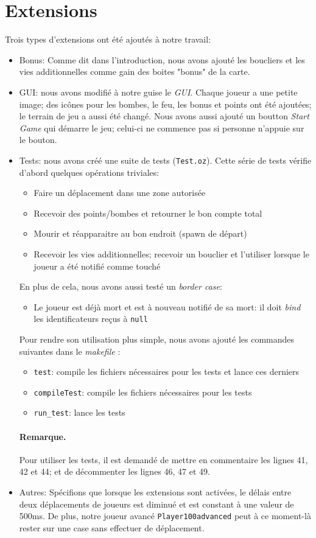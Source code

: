 \documentclass{article}
\begin{document}
\section{Extensions}
Trois types d'extensions ont été ajoutés à notre travail:
\begin{itemize}
	\item Bonus: Comme dit dans l'introduction, nous avons ajouté les boucliers et les vies additionnelles comme gain des boites "bonus" de la carte.
	\item GUI: nous avons modifié à notre guise le \emph{GUI}. Chaque joueur a une petite image; des icônes pour les bombes, le feu, les bonus et points ont été ajoutées; le terrain de jeu a aussi été changé. Nous avons aussi ajouté un boutton \emph{Start Game} qui démarre le jeu; celui-ci ne commence pas si personne n'appuie sur le bouton. 
	\item Tests: nous avons créé une suite de tests (\texttt{Test.oz}). Cette série de tests vérifie d'abord quelques opérations triviales:
		\begin{itemize}
			\item Faire un déplacement dans une zone autorisée
			\item Recevoir des points/bombes et retourner le bon compte total
			\item Mourir et réapparaitre au bon endroit (spawn de départ)
			\item Recevoir les vies additionnelles; recevoir un bouclier et l'utiliser lorsque le joueur a été notifié comme touché
		\end{itemize}
	En plus de cela, nous avons aussi testé un \emph{border case}:
		\begin{itemize}
			\item Le joueur est déjà mort et est à nouveau notifié de sa mort: il doit \emph{bind} les identificateurs reçus à \texttt{null}
			
		\end{itemize}
	Pour rendre son utilisation plus simple, nous avons ajouté les commandes suivantes dans le \emph{makefile} :
	\begin{itemize}
		\item \texttt{test}: compile les fichiers nécessaires pour les tests et lance ces derniers
		\item \texttt{compileTest}: compile les fichiers nécessaires pour les tests
		\item \texttt{run\_test}: lance les tests
	\end{itemize}
	\paragraph{Remarque.}Pour utiliser les tests, il est demandé de mettre en commentaire les lignes 41, 42 et 44; et de décommenter les lignes 46, 47 et 49.
	\item Autres: Spécifions que lorsque les extensions sont activées, le délais entre deux déplacements de joueurs est diminué et est constant à une valeur de 500ms. De plus, notre joueur avancé \texttt{Player100advanced} peut à ce moment-là rester sur une case sans effectuer de déplacement.
\end{itemize}
\end{document}
